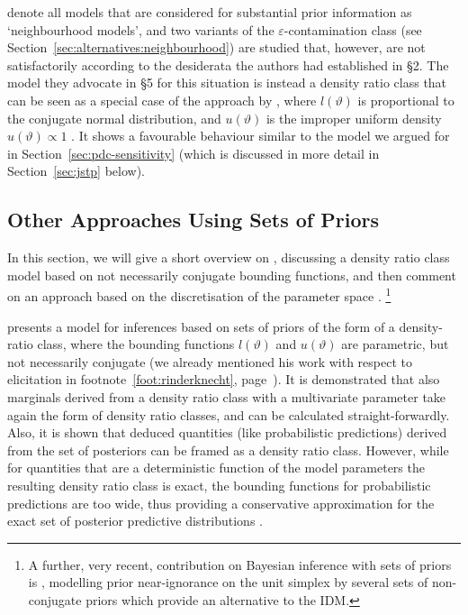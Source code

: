 \textcite[\S 4]{1991:pericchi} denote all models that are considered
for substantial prior information as `neighbourhood models',
and two variants of the $\varepsilon$-contamination class (see Section~\ref{sec:alternatives:neighbourhood}) are studied
that, however, are not satisfactorily according to the desiderata the authors had established in \S 2.
The model they advocate in \S 5 for this situation %
is instead a density ratio class that
can be seen as a special case of the approach by \textcite[see below]{2011:rinderknecht:diss},
where $l(\vartheta)$ is proportional to the conjugate normal distribution,
and $u(\vartheta)$ is the improper uniform density $u(\vartheta) \propto 1$ \parencite[\S 4.3]{1991:pericchi}.
It shows a favourable behaviour similar to the model we argued for in Section~\ref{sec:pdc-sensitivity}
(which is discussed in more detail in Section~\ref{sec:jstp} below).


\subsection{Other Approaches Using Sets of Priors}
\label{sec:alternatives:other}

In this section, we will give a short overview on \textcite[\S 4]{2011:rinderknecht:diss},
discussing a density ratio class model based on not necessarily conjugate bounding functions,
and then comment on an approach based on the discretisation of the parameter space
\parencite{2005:whitcomb}.%
\footnote{A further, very recent, contribution on Bayesian inference with sets of priors
is \textcite{2013:mangilibenavoli}, modelling prior near-ignorance on the unit simplex
by several sets of non-conjugate priors which provide an alternative to the IDM.}

\medskip

\textcite[\S 4]{2011:rinderknecht:diss} presents a model for inferences 
based on sets of priors of the form of a density-ratio class,
where the bounding functions $l(\vartheta)$ and $u(\vartheta)$ are parametric, but not necessarily conjugate
(we already mentioned his work with respect to elicitation in footnote~\ref{foot:rinderknecht}, page~\pageref{foot:rinderknecht}).
It is demonstrated that also marginals derived from a density ratio class with a multivariate parameter
take again the form of density ratio classes, and can be calculated straight-forwardly.
Also, it is shown that deduced quantities (like probabilistic predictions) derived from the set of posteriors
can be framed as a density ratio class.
However, while for quantities that are a deterministic function of the model parameters
the resulting density ratio class is exact, the bounding functions %
for probabilistic predictions are too wide, thus providing a conservative approximation for
the exact set of posterior predictive distributions \parencite[\S 4.2.4]{2011:rinderknecht:diss}.


